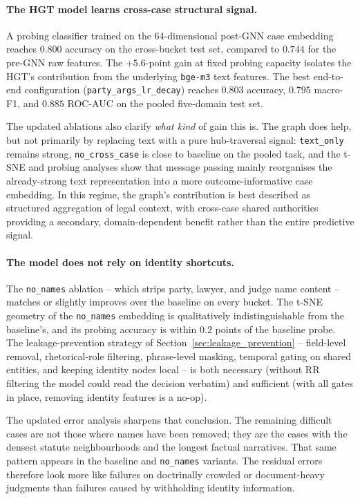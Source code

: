 \paragraph{The HGT model learns cross-case structural signal.} A
probing classifier trained on the $64$-dimensional post-GNN case
embedding reaches $0.800$ accuracy on the cross-bucket test set,
compared to $0.744$ for the pre-GNN raw features. The $+5.6$-point
gain at fixed probing capacity isolates the HGT's contribution from
the underlying \texttt{bge-m3} text features. The best end-to-end
configuration (\texttt{party\_args\_lr\_decay}) reaches
$0.803$ accuracy, $0.795$ macro-F1, and $0.885$ ROC-AUC on the pooled
five-domain test set.

{\color{blue}The updated ablations also clarify \emph{what kind} of
gain this is. The graph does help, but not primarily by replacing text
with a pure hub-traversal signal: \texttt{text\_only} remains strong,
\texttt{no\_cross\_case} is close to baseline on the pooled task, and
the t-SNE and probing analyses show that message passing mainly
reorganises the already-strong text representation into a more
outcome-informative case embedding. In this regime, the graph's
contribution is best described as structured aggregation of legal
context, with cross-case shared authorities providing a secondary,
domain-dependent benefit rather than the entire predictive signal.\par}

\paragraph{The model does not rely on identity shortcuts.} The
\texttt{no\_names} ablation -- which strips party, lawyer, and judge
name content -- matches or slightly improves over the baseline on
every bucket. The t-SNE geometry of the \texttt{no\_names} embedding
is qualitatively indistinguishable from the baseline's, and its
probing accuracy is within $0.2$ points of the baseline probe. The
leakage-prevention strategy of
Section~\ref{sec:leakage_prevention} -- field-level removal,
rhetorical-role filtering, phrase-level masking, temporal gating on
shared entities, and keeping identity nodes local -- is both
necessary (without RR filtering the model could read the decision
verbatim) and sufficient (with all gates in place, removing identity
features is a no-op).

{\color{blue}The updated error analysis sharpens that conclusion. The
remaining difficult cases are not those where names have been removed;
they are the cases with the densest statute neighbourhoods and the
longest factual narratives. That same pattern appears in the baseline
and \texttt{no\_names} variants. The residual errors therefore look
more like failures on doctrinally crowded or document-heavy judgments
than failures caused by withholding identity information.\par}

